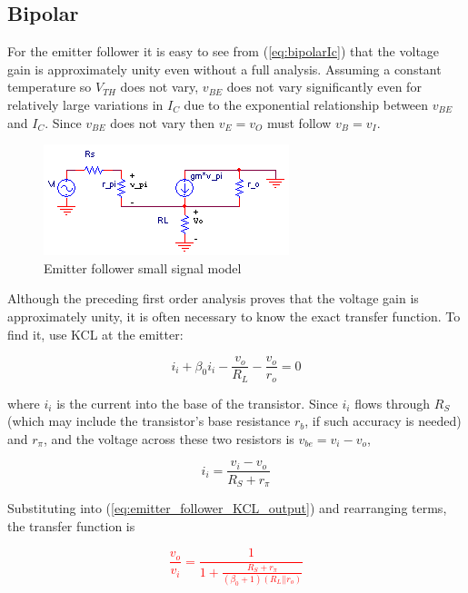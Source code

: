 \subsection{Bipolar}
For the emitter follower it is easy to see from (\ref{eq:bipolarIc}) that the voltage gain is approximately unity even without a full analysis. Assuming a constant temperature so $V_{TH}$ does not vary, $v_{BE}$ does not vary significantly even for relatively large variations in $I_{C}$ due to the exponential relationship between $v_{BE}$ and $I_{C}$. Since $v_{BE}$ does not vary then $v_{E} = v_{O}$ must follow $v_{B} = v_{I}$.
\begin{figure}[h]
	\centering
		\includegraphics{schematics/ss_emitterfollower.PNG}
	\caption{Emitter follower small signal model}
	\label{fig:ss_emitterfollower}
\end{figure}
\par
Although the preceding first order analysis proves that the voltage gain is approximately unity, it is often necessary to know the exact transfer function. To find it, use KCL at the emitter:

\begin{equation}
i_{i}+\beta_{0} i_{i} - \frac{v_{o}}{R_{L}} - \frac{v_{o}}{r_{o}} = 0
\label{eq:emitter_follower_KCL_output}
\end{equation}

\noindent where $i_{i}$ is the current into the base of the transistor. Since $i_{i}$ flows through $R_{S}$ (which may include the transistor's base resistance $r_{b}$, if such accuracy is needed) and $r_{\pi}$, and the voltage across these two resistors is $v_{be} = v_{i} - v_{o}$, 

\begin{equation}
i_{i} = \frac{v_{i}-v_{o}}{R_{S}+r_{\pi}}
\label{eq:emitter_follower_i_i}
\end{equation}

\noindent Substituting into (\ref{eq:emitter_follower_KCL_output}) and rearranging terms, the transfer function is

\textcolor{red}{
\begin{equation}
\frac{v_{o}}{v_{i}} = \frac{1}{1+\frac{R_{S}+r_{\pi}}{(\beta_{0} + 1)(R_{L}||r_{o})}}
\label{eq:emitter_follower}
\end{equation}
}

